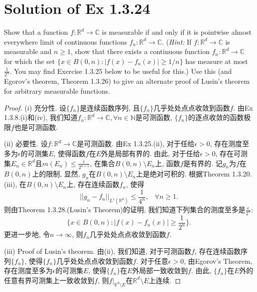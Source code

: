 \documentclass[reqno,a4paper,10pt]{amsart}
\newcommand\Rnum{\mathbb{R}}
\newcommand{\abs}[1]{\left\vert#1\right\vert}
\begin{document}
\section{Solution of Ex 1.3.24}
Show that a function $f:\Rnum^d\to \mathbb{C}$ is measurable if and only if it is pointwise almost everywhere limit of continuous functions $f_n:\Rnum^d\to \mathbb{C}$. (\textit{Hint:} If $f:\Rnum^d\to\mathbb{C}$ is measurable and $n\geq 1$, show that there exists a continuous function $f_n:\Rnum^d\to \mathbb{C}$ for which the set $\{x\in B(0,n):\abs{f(x)-f_n(x)}\geq 1/n\}$ has measure at most $\frac{1}{2^n}$. You may find Exercise 1.3.25 below to be useful for this.) Use this (and Egorov's theorem, Theorem 1.3.26) to give an alternate proof of Lusin's theorem for arbitrary measurable functions.
\begin{proof}
    (i) 充分性. 设$\{f_n\}$是连续函数序列, 且$\{f_n\}$几乎处处点点收敛到函数$f$. 由Ex 1.3.8.(i)和(iv), 我们知道$f_n:\Rnum^d\to \mathbb{C},\forall n\in\mathbb{N}$是可测函数, $\{f_n\}$的逐点收敛的函数极限$f$也是可测函数. 

    (ii) 必要性. 设$f:\Rnum^d\to \mathbb{C}$是可测函数. 由Ex 1.3.25.(ii), 对于任给$\epsilon>0$, 存在测度至多为$\epsilon$的可测集$E$, 使得函数$f$在$E$外是局部有界的. 由此, 对于任给$\epsilon>0$, 存在可测集$E_n\in \Rnum^d$且$m(E_n)\leq \frac{\epsilon}{2^{n+1}}$, 在集合$B(0,n)\setminus E_n$上, 函数$f$是有界的. 记$g_n$为$f$在$B(0,n)$上的限制, 显然, $g_n$在$B(0,n)\setminus E_n$上是绝对可积的. 根据Theorem 1.3.20.(iii), 在$B(0,n)\setminus E_n$上, 存在连续函数$f_n$, 使得
    \begin{equation*}
        ||g_n-f_n||_{L^1(\Rnum^d)}\leq \frac{1}{4^n},\;\;\;\forall n\geq 1.
    \end{equation*}
    则由Theorem 1.3.28.(Lusin's Theorem)的证明, 我们知道下列集合的测度至多是$\frac{\epsilon}{2^n}$:
    \begin{equation*}
        \{x\in B(0,n):\abs{f(x)-f_n(x)}\geq \frac{1}{2^n}\}.
    \end{equation*}
    更进一步地, 令$n\to\infty$, 则$f_n$几乎处处点点收敛到函数$f$. 

    (iii) Proof of Lusin's theorem. 由(ii), 我们知道, 对于可测函数$f$, 存在连续函数序列$\{f_n\}$, 使得$\{f_n\}$几乎处处点点收敛到函数$f$. 对于任意$\epsilon>0$, 由Egorov's Theorem, 存在测度至多为$\epsilon$的可测集$E$, 使得$\{f_n\}$在$E$外局部一致收敛到$f$. 由此, $\{f_n\}$在$E$外的任意有界可测集上一致收敛到$f$, 则$f|_{\Rnum^d\setminus E}$在$\Rnum^d\setminus E$上连续.
\end{proof}
\end{document}
